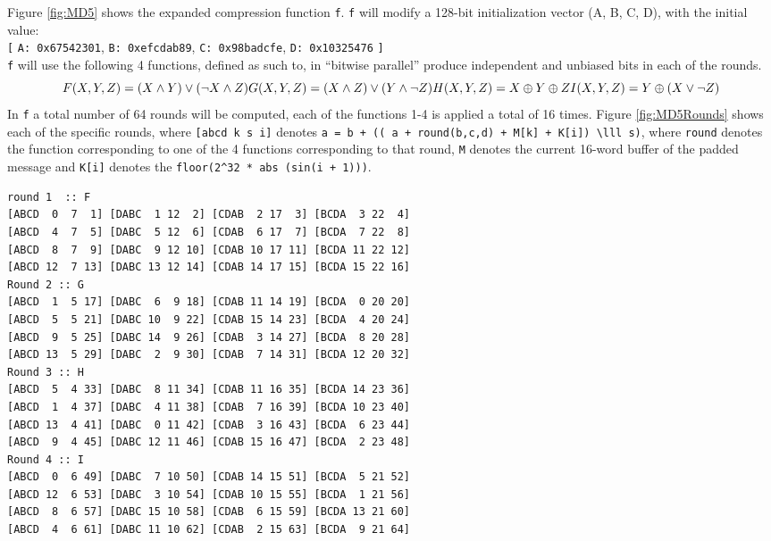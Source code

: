 \documentclass[a4paper]{article}
\begin{document}
Figure \ref{fig:MD5} shows the expanded compression function \texttt{f}. \texttt{f} will modify a 128-bit initialization vector (A, B, C, D), with the initial value:\\
\texttt{[} \texttt{A: 0x67542301}, \texttt{B: 0xefcdab89}, \texttt{C: 0x98badcfe}, \texttt{D: 0x10325476} \texttt{]}\\
\texttt{f} will use the following 4 functions, defined as such to, in ``bitwise parallel'' produce independent and unbiased bits in each of the rounds.
\begin{equation}
F(X, Y, Z) = (X \wedge Y) \vee (\neg X \wedge Z) \\
G(X, Y, Z) = (X \wedge Z) \vee (Y \wedge \neg Z) \\
H(X, Y, Z) = X \oplus Y \oplus Z \\
I(X, Y, Z) = Y \oplus ( X \vee \neg Z) \\
\end{equation}
In \texttt{f} a total number of 64 rounds will be computed, each of the functions 1-4 is applied a total of 16 times. Figure \ref{fig:MD5Rounds} shows each of the specific rounds, where \texttt{[abcd k s i]} denotes \texttt{a = b + (( a + round(b,c,d) + M[k] + K[i]) \textbackslash{}lll s)}, where \texttt{round} denotes the function corresponding to one of the 4 functions corresponding to that round, \texttt{M} denotes the current 16-word buffer of the padded message and \texttt{K[i]} denotes the \texttt{floor(2\textasciicircum{}32 * abs (sin(i + 1)))}.
\begin{verbatim}
round 1  :: F
[ABCD  0  7  1] [DABC  1 12  2] [CDAB  2 17  3] [BCDA  3 22  4]
[ABCD  4  7  5] [DABC  5 12  6] [CDAB  6 17  7] [BCDA  7 22  8]
[ABCD  8  7  9] [DABC  9 12 10] [CDAB 10 17 11] [BCDA 11 22 12]
[ABCD 12  7 13] [DABC 13 12 14] [CDAB 14 17 15] [BCDA 15 22 16]
Round 2 :: G
[ABCD  1  5 17] [DABC  6  9 18] [CDAB 11 14 19] [BCDA  0 20 20]
[ABCD  5  5 21] [DABC 10  9 22] [CDAB 15 14 23] [BCDA  4 20 24]
[ABCD  9  5 25] [DABC 14  9 26] [CDAB  3 14 27] [BCDA  8 20 28]
[ABCD 13  5 29] [DABC  2  9 30] [CDAB  7 14 31] [BCDA 12 20 32]
Round 3 :: H
[ABCD  5  4 33] [DABC  8 11 34] [CDAB 11 16 35] [BCDA 14 23 36]
[ABCD  1  4 37] [DABC  4 11 38] [CDAB  7 16 39] [BCDA 10 23 40]
[ABCD 13  4 41] [DABC  0 11 42] [CDAB  3 16 43] [BCDA  6 23 44]
[ABCD  9  4 45] [DABC 12 11 46] [CDAB 15 16 47] [BCDA  2 23 48]
Round 4 :: I
[ABCD  0  6 49] [DABC  7 10 50] [CDAB 14 15 51] [BCDA  5 21 52]
[ABCD 12  6 53] [DABC  3 10 54] [CDAB 10 15 55] [BCDA  1 21 56]
[ABCD  8  6 57] [DABC 15 10 58] [CDAB  6 15 59] [BCDA 13 21 60]
[ABCD  4  6 61] [DABC 11 10 62] [CDAB  2 15 63] [BCDA  9 21 64]
\end{verbatim}
\end{document}
